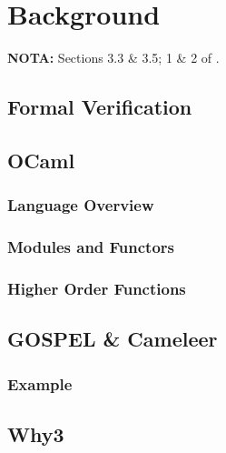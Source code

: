 
%

\chapter{Background}
\label{cha:background}

\textbf{NOTA:} Sections 3.3 \& 3.5; 1 \& 2 of \cite{pyramid_of_formal_verification}.

\section{Formal Verification}
\label{sec:formal_verification}

\section{OCaml}
\label{sec:ocaml}

\subsection{Language Overview} %
\label{sub:language_overview}

\subsection{Modules and Functors} %
\label{sub:modules_and_functors}

\subsection{Higher Order Functions}
\label{sub:higher_order_functions}

\section{GOSPEL \& Cameleer}
\label{sec:gospel_and_cameleer}

\subsection{Example}
\label{sub:example}

\section{Why3}
\label{sec:why3}

